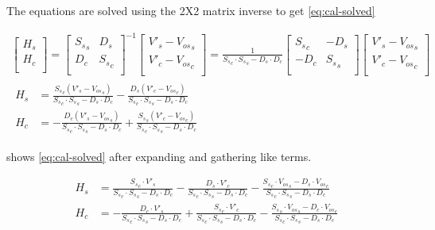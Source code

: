 The equations are solved using the 2X2 matrix inverse to get \cref{eq:cal-solved}

\begin{gather}
    \begin{bmatrix}
        H_s\\
        H_c\\
    \end{bmatrix} =
    \begin{bmatrix}
        {S_s}_s & D_s \\
        D_c & {S_s}_c \\
    \end{bmatrix} ^{-1}
    \begin{bmatrix}
        V'_s - {V_{os}}_s\\
        V'_c - {V_{os}}_c\\
    \end{bmatrix}
    =
    \frac{1}{{S_s}_c \cdot {S_s}_s - D_s \cdot D_c}
    \begin{bmatrix}
        {S_s}_c & -D_s \\
        -D_c & {S_s}_s \\
    \end{bmatrix}
    \begin{bmatrix}
        V'_s - {V_{os}}_s\\
        V'_c - {V_{os}}_c\\
    \end{bmatrix}\\
    \begin{aligned}
        H_s & = \frac{{S_s}_c \left( V'_s - {V_{os}}_s \right)}{{S_s}_c \cdot {S_s}_s - D_s \cdot D_c} - \frac{D_s \left( V'_c - {V_{os}}_c \right)}{{S_s}_c \cdot {S_s}_s - D_s \cdot D_c}\\
        H_c & = - \frac{D_c \left( V'_s - {V_{os}}_s \right)}{{S_s}_c \cdot {S_s}_s - D_s \cdot D_c} + \frac{{S_s}_s \left( V'_c - {V_{os}}_c \right)}{{S_s}_c \cdot {S_s}_s - D_s \cdot D_c}
    \end{aligned}
    \label{eq:cal-solved}
\end{gather}

 shows \cref{eq:cal-solved} after expanding and gathering like terms.

\begin{equation}
    \begin{aligned}
        H_s & = \frac{{S_s}_c \cdot V'_s }{{S_s}_c \cdot {S_s}_s - D_s \cdot D_c} - \frac{D_s \cdot  V'_c }{{S_s}_c \cdot {S_s}_s - D_s \cdot D_c} - \frac{{S_s}_c \cdot {V_{os}}_s  -D_s \cdot {V_{os}}_c}{{S_s}_c \cdot {S_s}_s - D_s \cdot D_c}\\
        H_c & = - \frac{D_c \cdot V'_s }{{S_s}_c \cdot {S_s}_s - D_s \cdot D_c} + \frac{{S_s}_c \cdot  V'_c }{{S_s}_c \cdot {S_s}_s - D_s \cdot D_c} - \frac{{S_s}_s \cdot {V_{os}}_s  -D_c \cdot {V_{os}}_c}{{S_s}_c \cdot {S_s}_s - D_s \cdot D_c}
    \end{aligned}
    \label{eq:cal-expanded}
\end{equation}

